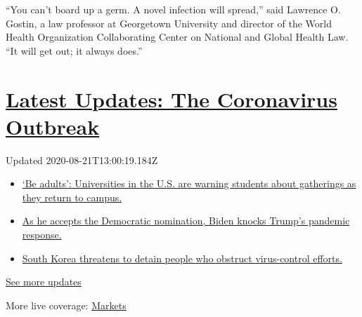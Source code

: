 ``You can't board up a germ. A novel infection will spread,'' said
Lawrence O. Gostin, a law professor at Georgetown University and
director of the World Health Organization Collaborating Center on
National and Global Health Law. ``It will get out; it always does.''

\hypertarget{latest-updates-the-coronavirus-outbreak}{%
\section{\texorpdfstring{\href{https://www.nytimes3xbfgragh.onion/2020/08/21/world/covid-19-coronavirus.html?action=click\&pgtype=Article\&state=default\&region=MAIN_CONTENT_1\&context=storylines_live_updates}{Latest
Updates: The Coronavirus
Outbreak}}{Latest Updates: The Coronavirus Outbreak}}\label{latest-updates-the-coronavirus-outbreak}}

Updated 2020-08-21T13:00:19.184Z

\begin{itemize}
\tightlist
\item
  \href{https://www.nytimes3xbfgragh.onion/2020/08/21/world/covid-19-coronavirus.html?action=click\&pgtype=Article\&state=default\&region=MAIN_CONTENT_1\&context=storylines_live_updates\#link-6a60a19d}{`Be
  adults': Universities in the U.S. are warning students about
  gatherings as they return to campus.}
\item
  \href{https://www.nytimes3xbfgragh.onion/2020/08/21/world/covid-19-coronavirus.html?action=click\&pgtype=Article\&state=default\&region=MAIN_CONTENT_1\&context=storylines_live_updates\#link-324af071}{As
  he accepts the Democratic nomination, Biden knocks Trump's pandemic
  response.}
\item
  \href{https://www.nytimes3xbfgragh.onion/2020/08/21/world/covid-19-coronavirus.html?action=click\&pgtype=Article\&state=default\&region=MAIN_CONTENT_1\&context=storylines_live_updates\#link-191d44be}{South
  Korea threatens to detain people who obstruct virus-control efforts.}
\end{itemize}

\href{https://www.nytimes3xbfgragh.onion/2020/08/21/world/covid-19-coronavirus.html?action=click\&pgtype=Article\&state=default\&region=MAIN_CONTENT_1\&context=storylines_live_updates}{See
more updates}

More live coverage:
\href{https://www.nytimes3xbfgragh.onion/live/2020/08/21/business/stock-market-today-coronavirus?action=click\&pgtype=Article\&state=default\&region=MAIN_CONTENT_1\&context=storylines_live_updates}{Markets}

